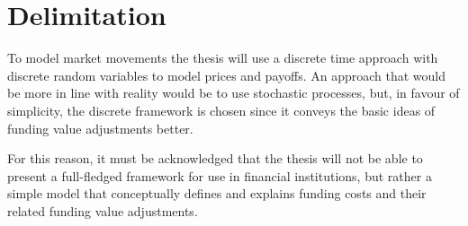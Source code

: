 \documentclass[main.tex]{subfiles}
\begin{document}
    \section{Delimitation}

    To model market movements the thesis will use a discrete time approach 
    with discrete random variables to model prices and payoffs.
    An approach that would be more in line with reality would be to use stochastic processes,
    but, in favour of simplicity, the discrete framework is chosen 
    since it conveys the basic ideas of funding value adjustments better.

    For this reason, it must be acknowledged that the thesis will not be able to
    present a full-fledged framework for use in financial institutions,
    but rather a simple model that conceptually defines and explains funding costs 
    and their related funding value adjustments.
\end{document}
